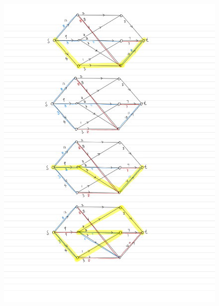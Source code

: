 \documentclass[]{article}
\theoremstyle{definition}
\begin{document}
        \begin{figure}
            \centering
            \includegraphics[width=14cm]{Settled Results Ready to Transfer-6.jpg}
        \end{figure}
\end{document}

